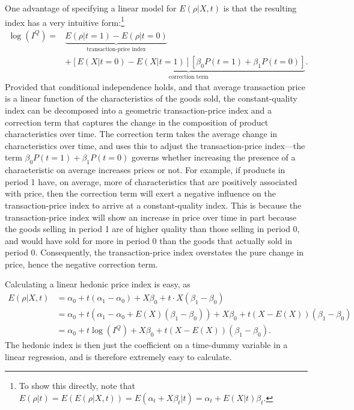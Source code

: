 \documentclass[]{article}
\begin{document}
One advantage of specifying a linear model for \(E(\rho | X, t)\) is that the resulting index has a very intuitive form:\footnote{To show this directly, note that \(E(\rho | t) = E(E(\rho | X, t)) = E(\alpha_{t} + X\beta_{t} | t) = \alpha_{t} + E(X | t) \beta_{t}\).}
\begin{align*}
\log(I^{Q}) =& \underbrace{E(\rho | t = 1) - E(\rho | t = 0)}_{\text{transaction-price index}}\\
&+ \underbrace{[E(X | t = 0) - E(X | t = 1)][\beta_{0} P(t = 1) + \beta_{1} P(t = 0)]}_{\text{correction term}}.
\end{align*}
Provided that conditional independence holds, and that average transaction price is a linear function of the characteristics of the goods sold, the constant-quality index can be decomposed into a geometric transaction-price index and a correction term that captures the change in the composition of product characteristics over time. The correction term takes the average change in characteristics over time, and uses this to adjust the transaction-price index---the term \(\beta_{0} P(t = 1) + \beta_{1} P(t = 0)\) governs whether increasing the presence of a characteristic on average increases prices or not. For example, if products in period 1 have, on average, more of characteristics that are positively associated with price, then the correction term will exert a negative influence on the transaction-price index to arrive at a constant-quality index. This is because the transaction-price index will show an increase in price over time in part because the goods selling in period 1 are of higher quality than those selling in period 0, and would have sold for more in period 0 than the goods that actually sold in period 0. Consequently, the transaction-price index overstates the pure change in price, hence the negative correction term.

Calculating a linear hedonic price index is easy, as
\begin{align*}
E(\rho | X, t) &= \alpha_{0} + t (\alpha_{1} - \alpha_{0}) + X \beta_{0} + t \cdot X (\beta_{1} - \beta_{0}) \\
&= \alpha_{0} + t (\alpha_{1} - \alpha_{0} + E(X)(\beta_{1} - \beta_{0})) + X \beta_{0} + t (X - E(X)) (\beta_{1} - \beta_{0}) \\
&= \alpha_{0} + t \log(I^{Q}) + X \beta_{0} + t (X - E(X)) (\beta_{1} - \beta_{0}).
\end{align*}
The hedonic index is then just the coefficient on a time-dummy variable in a linear regression, and is therefore extremely easy to calculate.
\end{document}
